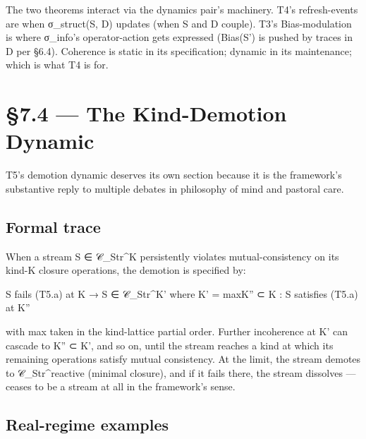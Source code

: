 \documentclass[11pt, openany]{book}
\newcommand{\sectionbreak}{\clearpage}
\begin{document}
The two theorems interact via the dynamics pair's machinery. T4's refresh-events are when σ\_\allowbreak{}struct(S, D) updates (when S and D couple). T3's Bias-modulation is where σ\_\allowbreak{}info's operator-action gets expressed (Bias(S') is pushed by traces in D per §6.4). Coherence is static in its specification; dynamic in its maintenance; which is what T4 is for.

\sectionbreak

\section{§7.4 --- The Kind-Demotion Dynamic}

T5's demotion dynamic deserves its own section because it is the framework's substantive reply to multiple debates in philosophy of mind and pastoral care.

\subsection{Formal trace}

When a stream S ∈ 𝒞\_\allowbreak{}Str\textasciicircum{}K persistently violates mutual-consistency on its kind-K closure operations, the demotion is specified by:

\begin{Code}
S fails (T5.a) at K → S ∈ 𝒞_Str^{K'} where K' = max{K'' ⊂ K : S satisfies (T5.a) at K''}
\end{Code}

with max taken in the kind-lattice partial order. Further incoherence at K' can cascade to K'' ⊂ K', and so on, until the stream reaches a kind at which its remaining operations satisfy mutual consistency. At the limit, the stream demotes to 𝒞\_\allowbreak{}Str\textasciicircum{}reactive (minimal closure), and if it fails there, the stream dissolves --- ceases to be a stream at all in the framework's sense.

\subsection{Real-regime examples}
\end{document}
